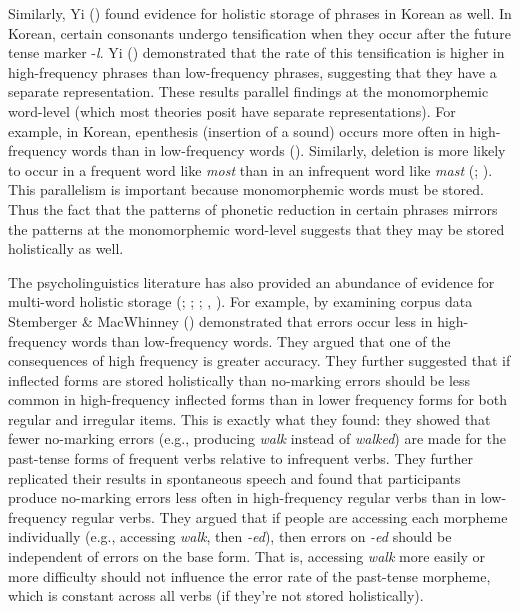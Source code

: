 \documentclass[
  12pt,
  letterpaper,
]{scrreport}
\begin{document}
Similarly, Yi () found evidence for
holistic storage of phrases in Korean as well. In Korean, certain
consonants undergo tensification when they occur after the future tense
marker -\emph{l}. Yi () demonstrated
that the rate of this tensification is higher in high-frequency phrases
than low-frequency phrases, suggesting that they have a separate
representation. These results parallel findings at the monomorphemic
word-level (which most theories posit have separate representations).
For example, in Korean, epenthesis (insertion of a sound) occurs more
often in high-frequency words than in low-frequency words
(). Similarly, deletion is more likely to occur in a
frequent word like \emph{most} than in an infrequent word like
\emph{mast} (;
). This parallelism is important because monomorphemic words must
be stored. Thus the fact that the patterns of phonetic reduction in
certain phrases mirrors the patterns at the monomorphemic word-level
suggests that they may be stored holistically as well.

The psycholinguistics literature has also provided an abundance of
evidence for multi-word holistic storage
(; ;
;
,
). For example, by
examining corpus data Stemberger \& MacWhinney
()
demonstrated that errors occur less in high-frequency words than
low-frequency words. They argued that one of the consequences of high
frequency is greater accuracy. They further suggested that if inflected
forms are stored holistically than no-marking errors should be less
common in high-frequency inflected forms than in lower frequency forms
for both regular and irregular items. This is exactly what they found:
they showed that fewer no-marking errors (e.g., producing \emph{walk}
instead of \emph{walked}) are made for the past-tense forms of frequent
verbs relative to infrequent verbs. They further replicated their
results in spontaneous speech and found that participants produce
no-marking errors less often in high-frequency regular verbs than in
low-frequency regular verbs. They argued that if people are accessing
each morpheme individually (e.g., accessing \emph{walk}, then
\emph{-ed}), then errors on \emph{-ed} should be independent of errors
on the base form. That is, accessing \emph{walk} more easily or more
difficulty should not influence the error rate of the past-tense
morpheme, which is constant across all verbs (if they're not stored
holistically).
\end{document}
